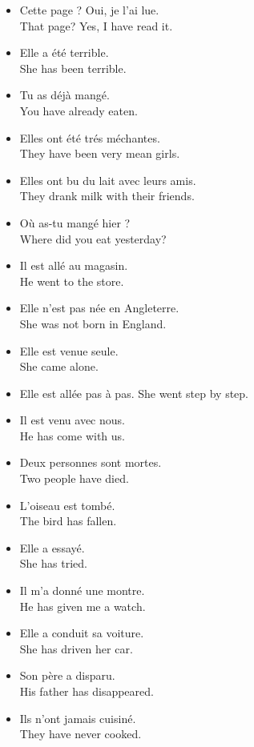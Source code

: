 \begin{itemize}
  \item  Cette page ? Oui, je l'ai lue. \\ That page?  Yes, I have read it.
	\item  Elle a {\'e}t{\'e} terrible. \\ She has been terrible.
	\item  Tu as d{\'e}j{\`a} mang{\'e}. \\ You have already eaten.
	\item  Elles ont {\'e}t{\'e} tr{\'e}s m{\'e}chantes. \\ They have been very mean girls.
	\item  Elles ont bu du lait avec leurs amis. \\ They drank milk with their friends.
	\item  O{\`u} as-tu mang{\'e} hier ? \\ Where did you eat yesterday?
	\item  Il est all{\'e} au magasin. \\ He went to the store.
	\item  Elle n'est pas n{\'e}e en Angleterre. \\ She was not born in England.
	\item  Elle est venue seule. \\ She came alone.
	\item  Elle est all{\'e}e pas {\`a} pas.  She went step by step.
	\item  Il est venu avec nous. \\ He has come with us.
	\item  Deux personnes sont mortes. \\ Two people have died.
	\item  L'oiseau est tomb{\'e}. \\ The bird has fallen.
	\item  Elle a essay{\'e}. \\ She has tried.
	\item  Il m'a donn{\'e} une montre. \\ He has given me a watch.
	\item  Elle a conduit sa voiture. \\ She has driven her car.
	\item  Son p{\`e}re a disparu. \\ His father has disappeared.
	\item  Ils n'ont jamais cuisin{\'e}. \\ They have never cooked.

\end{itemize}
